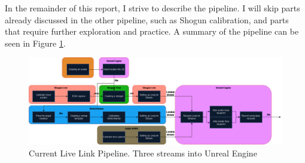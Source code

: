 \documentclass{uva-inf-article}
\begin{document}
In the remainder of this report, I strive to describe the pipeline. I will skip parts already discussed in the other pipeline, such as Shogun calibration, and parts that require further exploration and practice. A summary of the pipeline can be seen in Figure \ref{fig:pipeline}.

\begin{landscape}
\vspace*{\fill}
\begin{figure}[hbt!]
    \centering
    \includegraphics[width=1.5\textheight]{imgs/pipeline16-2-24.png}
    \caption{Current Live Link Pipeline. Three streams into Unreal Engine}
    \label{fig:pipeline}
\end{figure}
\vspace*{\fill}
\end{landscape}
\end{document}
